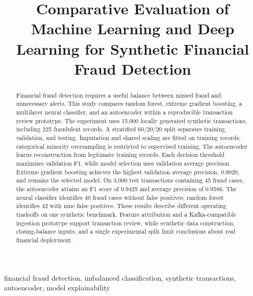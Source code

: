 \documentclass[conference]{IEEEtran}
\begin{document}
\title{Comparative Evaluation of Machine Learning and Deep Learning for Synthetic Financial Fraud Detection}
\author{
\and{}
\and{}
}
\maketitle
\begin{abstract}
Financial fraud detection requires a useful balance between missed fraud and unnecessary alerts. This study compares random forest, extreme gradient boosting, a multilayer neural classifier, and an autoencoder within a reproducible transaction review prototype. The experiment uses 15,000 locally generated synthetic transactions, including 225 fraudulent records. A stratified 60/20/20 split separates training, validation, and testing. Imputation and shared scaling are fitted on training records; categorical minority oversampling is restricted to supervised training. The autoencoder learns reconstruction from legitimate training records. Each decision threshold maximizes validation F1, while model selection uses validation average precision. Extreme gradient boosting achieves the highest validation average precision, 0.9020, and remains the selected model. On 3,000 test transactions containing 45 fraud cases, the autoencoder attains an F1 score of 0.9425 and average precision of 0.9586. The neural classifier identifies 40 fraud cases without false positives; random forest identifies 42 with nine false positives. These results describe different operating tradeoffs on one synthetic benchmark. Feature attribution and a Kafka-compatible ingestion prototype support transaction review, while synthetic data construction, closing-balance inputs, and a single experimental split limit conclusions about real financial deployment.
\end{abstract}
\begin{IEEEkeywords}
financial fraud detection, imbalanced classification, synthetic transactions, autoencoder, model explainability
\end{IEEEkeywords}
\end{document}
